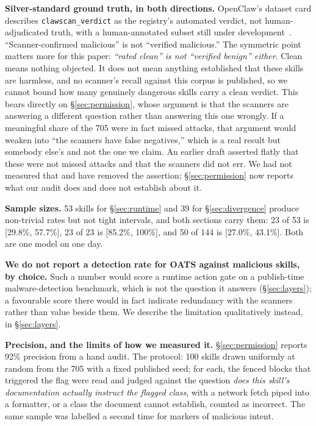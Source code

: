 \documentclass[10pt]{article}
\begin{document}
\textbf{Silver-standard ground truth, in both directions.} OpenClaw's dataset card
describes \texttt{clawscan\_verdict} as the registry's automated verdict, not
human-adjudicated truth, with a human-annotated subset still under
development~\cite{clawhubdataset}. ``Scanner-confirmed malicious'' is not ``verified
malicious.'' The symmetric point matters more for this paper: \emph{``rated clean'' is
not ``verified benign'' either}. Clean means nothing objected. It does not mean anything
established that these skills are harmless, and no scanner's recall against this
corpus is published, so we cannot bound how many genuinely dangerous skills carry a
clean verdict. This bears directly on \S\ref{sec:permission}, whose argument is that
the scanners are answering a different question rather than answering this one
wrongly. If a meaningful share of the 705 were in fact missed attacks, that argument
would weaken into ``the scanners have false negatives,'' which is a real result but
somebody else's and not the one we claim. An earlier draft asserted flatly that these
were not missed attacks and that the scanners did not err. We had not measured that
and have removed the assertion; \S\ref{sec:permission} now reports what our audit
does and does not establish about it.

\textbf{Sample sizes.} 53 skills for \S\ref{sec:runtime} and 39 for
\S\ref{sec:divergence} produce non-trivial rates but not tight intervals, and both
sections carry them: 23 of 53 is [29.8\%, 57.7\%], 23 of 23 is [85.2\%, 100\%], and
50 of 144 is [27.0\%, 43.1\%]. Both are one model on one day.

\textbf{We do not report a detection rate for OATS against malicious skills, by
choice.} Such a number would score a runtime action gate on a publish-time
malware-detection benchmark, which is not the question it answers
(\S\ref{sec:layers}); a favourable score there would in fact indicate redundancy
with the scanners rather than value beside them. We describe the limitation
qualitatively instead, in \S\ref{sec:layers}.

\textbf{Precision, and the limits of how we measured it.} \S\ref{sec:permission}
reports 92\% precision from a hand audit. The protocol: 100 skills drawn uniformly at
random from the 705 with a fixed published seed; for each, the fenced blocks that
triggered the flag were read and judged against the question \emph{does this skill's
documentation actually instruct the flagged class}, with a network fetch piped into a
formatter, or a class the document cannot establish, counted as incorrect. The same
sample was labelled a second time for markers of malicious intent.
\end{document}
